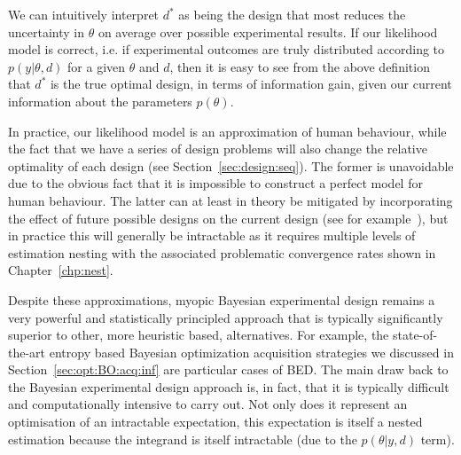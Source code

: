 We can intuitively interpret $d^*$ as being the design that most reduces the uncertainty in $\theta$
on average over possible experimental results.  If our likelihood model is correct, i.e. if experimental outcomes
are truly distributed according to $p(y | \theta, d)$ for a given $\theta$ and $d$, then it is easy to see 
from the above definition that
$d^*$ is the true optimal design, in terms of information gain, given our current information about
the parameters $p\left(\theta \right)$.  

In practice, our likelihood model is an approximation of
human behaviour, while the fact that we have a series of design problems will also change the
relative optimality of each design (see Section~\ref{sec:design:seq}).  The former is unavoidable due
to the obvious fact that it is impossible to construct a perfect model for human behaviour.  The latter
can at least in theory be mitigated by incorporating the effect of future possible designs on the
current design (see for example~\cite{gonzalez2016glasses}), but in practice this will generally be
intractable as it requires multiple levels of estimation nesting with the associated problematic convergence
rates shown in Chapter~\ref{chp:nest}. 

Despite these approximations, myopic Bayesian experimental design remains a very powerful and
statistically principled approach that is typically significantly superior to other, more heuristic based,
alternatives.  For example, the state-of-the-art entropy based Bayesian optimization acquisition strategies we 
discussed in Section~\ref{sec:opt:BO:acq:inf} are particular cases of BED.
The main draw back to the Bayesian experimental design 
approach is, in fact, that it is typically difficult and computationally intensive to carry out.  
Not only does it represent an optimisation 
of an intractable expectation, this expectation is itself a nested estimation because
the integrand is itself intractable (due to the $p\left(\theta | y, d\right)$ term).